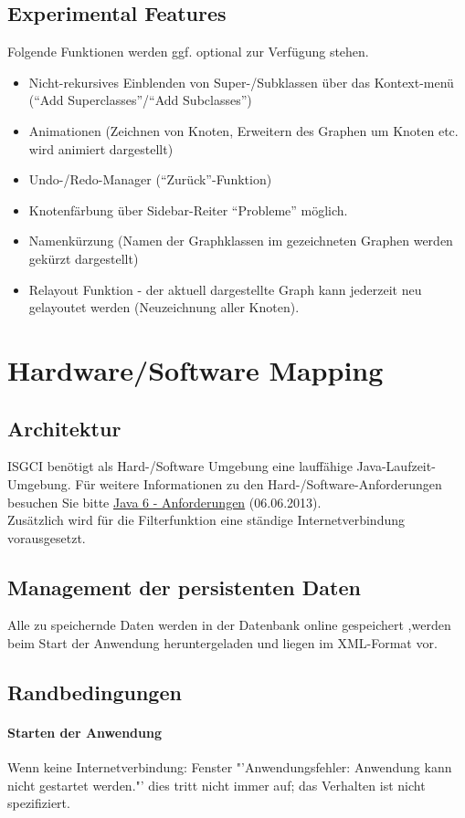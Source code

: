\documentclass[10pt,a4paper]{article}
\begin{document}
\subsection{Experimental Features}
Folgende Funktionen werden ggf. optional zur Verfügung stehen.
\begin{itemize}
\item Nicht-rekursives Einblenden von Super-/Subklassen über das Kontext-menü ("`Add Superclasses"'/"`Add Subclasses"') 
\item Animationen (Zeichnen von Knoten, Erweitern des Graphen um Knoten etc. wird animiert dargestellt)
\item Undo-/Redo-Manager ("`Zurück"'-Funktion)
\item Knotenfärbung über Sidebar-Reiter "`Probleme"' möglich.
\item Namenkürzung (Namen der Graphklassen im gezeichneten Graphen werden gekürzt dargestellt)
\item Relayout Funktion - der aktuell dargestellte Graph kann jederzeit neu gelayoutet werden (Neuzeichnung aller Knoten).
\end{itemize}

\newpage
\section{Hardware/Software Mapping}
\subsection{Architektur}
ISGCI benötigt als Hard-/Software Umgebung eine lauffähige Java-Laufzeit-Umgebung. Für weitere Informationen zu den Hard-/Software-Anforderungen besuchen Sie bitte 
\href{http://www.oracle.com/technetwork/java/javase/system-configurations-135212.html}{Java 6 - Anforderungen} (06.06.2013).
\\Zusätzlich wird für die Filterfunktion eine ständige Internetverbindung vorausgesetzt.

\subsection{Management der persistenten Daten}
Alle zu speichernde Daten werden in der Datenbank online gespeichert ,werden beim Start der Anwendung heruntergeladen und liegen im XML-Format vor.
\subsection{Randbedingungen}
\paragraph{Starten der Anwendung}
Wenn keine Internetverbindung: Fenster "'Anwendungsfehler: Anwendung kann nicht gestartet werden."' dies tritt nicht immer auf; das Verhalten ist nicht spezifiziert.
\end{document}
